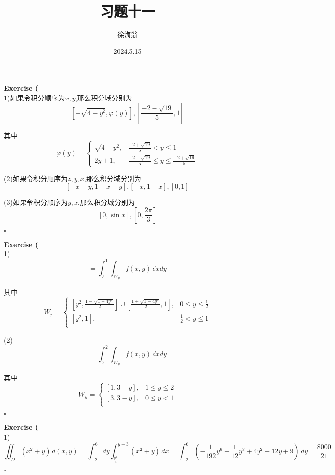\documentclass[11pt,hyperref,a4paper,UTF8]{ctexart}
\title{习题十一}
\author{徐海翁}
\date{2024.5.15}
\newenvironment{exercise}[1]{%
{\textbf{Exercise #1} \\ 
    }
}{
  \hfill $\square$ 
  \par\bigskip 
}
\newcommand{\parameter}[1]{\left(#1\right)}
\begin{document}
\begin{CJK}{UTF8}{gkai}

\maketitle

\begin{exercise}{3}
(1)如果令积分顺序为$x,y$,那么积分域分别为
\[\left[-\sqrt{4 - y^2},\varphi(y)\right],\left[\frac{-2 - \sqrt{19}}{5},1\right]\]

其中
\[\varphi(y) = \begin{cases}
    \sqrt{4 - y^2},& \frac{-2 + \sqrt{19}}{5} < y \leq 1\\
    2y + 1, &\frac{-2 - \sqrt{19}}{5} \leq y \leq \frac{-2 + \sqrt{19}}{5}
\end{cases}\]

(2)如果令积分顺序为$z,y,x$,那么积分域分别为
\[\left[-x - y, 1 - x - y\right],\left[-x ,1 - x\right],\left[0,1\right]\]

(3)如果令积分顺序为$y,x$,那么积分域分别为
\[\left[0,\sin x\right], \left[0,\frac{2\pi}{3}\right]\]
\end{exercise}

\begin{exercise}{4}
    (1)
    \[= \int_{0}^{1}\int_{W_y} f(x,y)\, dx dy\]

    其中
    \[W_y = \begin{cases}
        [y^2,\frac{1 - \sqrt{1 - 4y^2}}{2}]\cup [\frac{1 + \sqrt{1 - 4y^2}}{2},1],& 0 \leq y \leq \frac{1}{2}\\
        [y^2,1],& \frac{1}{2} < y \leq 1\\
    \end{cases}\]

    (2)
    \[= \int_{0}^{2} \int_{W_y} f(x,y)\, dx dy\]

    其中
    \[W_y = \begin{cases}
        [1 , 3 - y],& 1 \leq y \leq 2\\
        [3, 3 - y],& 0 \leq y < 1\\
    \end{cases}\]
\end{exercise}

\begin{exercise}{5}
    (1)
    \[\iint_D (x^2 + y)\, d(x,y) = \int_{-2}^{6} dy \int_{\frac{y^2}{4}}^{y + 3}(x^2 + y)\, dx = \int_{-2}^{6}\parameter{- \frac{1}{192}y^6 + \frac{1}{12}y^3 + 4 y^2 + 12y + 9}\,dy = \frac{8000}{21}\]


\end{exercise}
\end{CJK}
\end{document}
